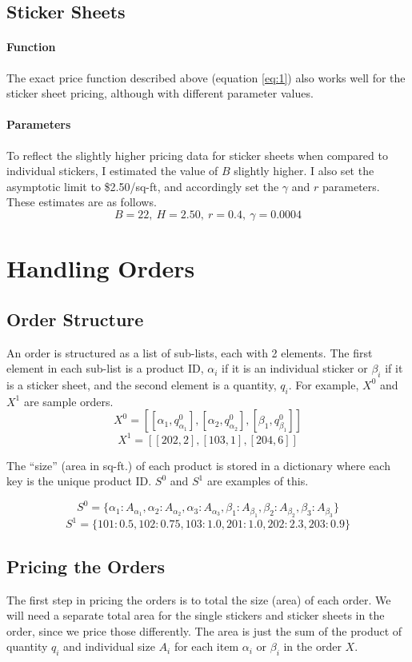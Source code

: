 \documentclass{article}
\begin{document}
\subsection{Sticker Sheets}
\paragraph{Function}
The exact price function described above (equation \ref{eq:1}) also works well for the sticker sheet pricing, although with different parameter values.

\paragraph{Parameters}
To reflect the slightly higher pricing data for sticker sheets when compared to individual stickers, I estimated the value of $B$ slightly higher. I also set the asymptotic limit to \$2.50/sq-ft, and accordingly set the $\gamma$ and $r$ parameters. These estimates are as follows.
\[ B=22, \ H=2.50, \ r=0.4, \ \gamma=0.0004 \]


\section{Handling Orders}

\subsection{Order Structure}
An order is structured as a list of sub-lists, each with 2 elements. The first element in each sub-list is a product ID, $\alpha_i$ if it is an individual sticker or $\beta_i$ if it is a sticker sheet, and the second element is a quantity, $q_i$. For example, $X^0$ and $X^1$ are sample orders.
$$ 
X^0 = [[\alpha_1, q_{\alpha_1}^0], [\alpha_2, q_{\alpha_2}^0], [\beta_1, q_{\beta_1}^0]]
$$
$$ X^1 = [[202, 2], [103, 1], [204, 6]] $$

The ``size'' (area in sq-ft.) of each product is stored in a dictionary where each key is the unique product ID. $S^0$ and $S^1$ are examples of this.

$$ 
S^0 = \{\alpha_1: A_{\alpha_1}, \alpha_2: A_{\alpha_2}, \alpha_3: A_{\alpha_3}, \beta_1: A_{\beta_1}, \beta_2: A_{\beta_2}, \beta_3: A_{\beta_3} \}
$$
$$
S^1 = \{101: 0.5, 102: 0.75, 103: 1.0, 201: 1.0, 202: 2.3, 203: 0.9\} 
$$

\subsection{Pricing the Orders}
The first step in pricing the orders is to total the size (area) of each order. We will need a separate total area for the single stickers and sticker sheets in the order, since we price those differently. The area is just the sum of the product of quantity $q_i$ and individual size $A_i$ for each item $\alpha_i$ or $\beta_i$ in the order $X$.
 
\end{document}
